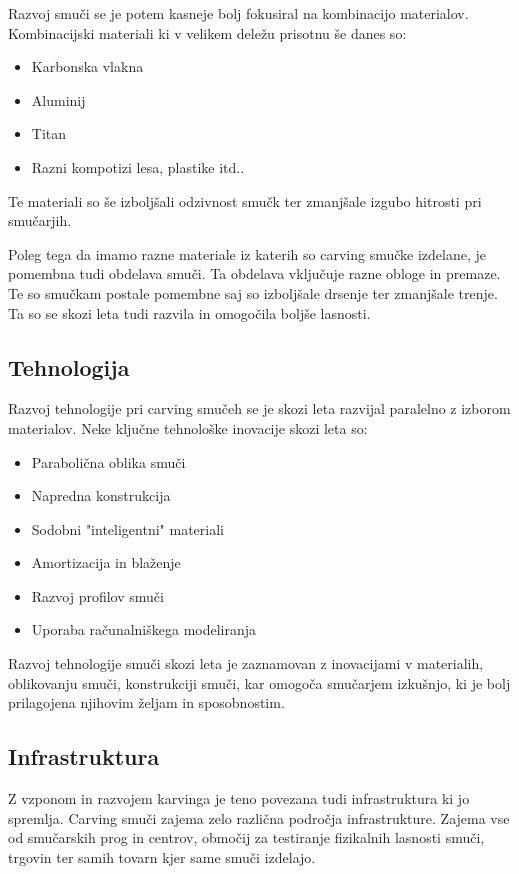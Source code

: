 \documentclass{article}
\begin{document}
Razvoj smuči se je potem kasneje bolj fokusiral na kombinacijo materialov.
Kombinacijski materiali ki v velikem deležu prisotnu še danes so: 
\begin{itemize}
    \item Karbonska vlakna
    \item Aluminij
    \item Titan
    \item Razni kompotizi lesa, plastike itd..
\end{itemize}
Te materiali so še izboljšali odzivnost smučk ter zmanjšale izgubo hitrosti pri smučarjih.

\*

Poleg tega da imamo razne materiale iz katerih so carving smučke izdelane, je pomembna tudi obdelava smuči.
Ta obdelava vključuje razne obloge in premaze. Te so smučkam postale pomembne saj so izboljšale drsenje ter zmanjšale trenje. 
Ta so se skozi leta tudi razvila in omogočila boljše lasnosti.


\subsection*{Tehnologija}
Razvoj tehnologije pri carving smučeh se je skozi leta razvijal paralelno z izborom materialov.
Neke ključne tehnološke inovacije skozi leta so:
\begin{itemize}
    \item Parabolična oblika smuči
    \item Napredna konstrukcija
    \item Sodobni "inteligentni" materiali
    \item Amortizacija in blaženje
    \item Razvoj profilov smuči
    \item Uporaba računalniškega modeliranja
\end{itemize}

\*

Razvoj tehnologije smuči skozi leta je zaznamovan z inovacijami v materialih, oblikovanju smuči, konstrukciji smuči, kar omogoča smučarjem izkušnjo, ki je bolj prilagojena njihovim željam in sposobnostim.

\subsection*{Infrastruktura}
Z vzponom in razvojem karvinga je teno povezana tudi infrastruktura ki jo spremlja.
Carving smuči zajema zelo različna področja infrastrukture. Zajema vse od smučarskih prog in centrov, območij za testiranje fizikalnih lasnosti smuči, trgovin ter samih tovarn kjer same smuči izdelajo.
\end{document}
